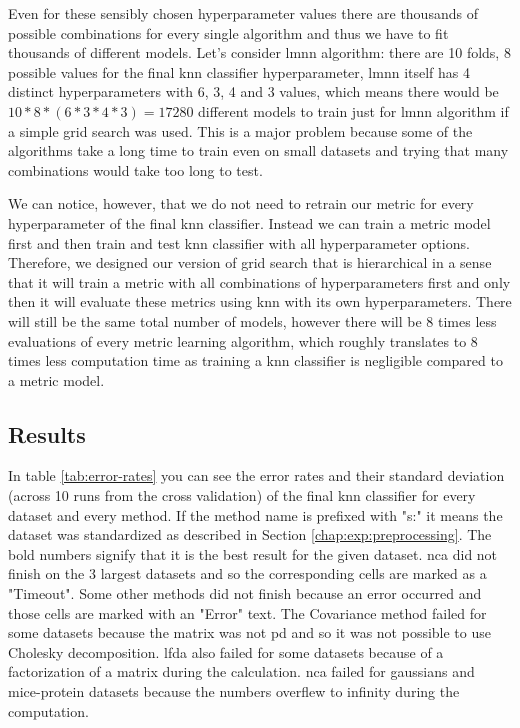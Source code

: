 \documentclass[12pt,a4paper]{report}
\begin{document}


Even for these sensibly chosen hyperparameter values there are thousands of possible combinations for every single algorithm and thus we have to fit thousands of different models. Let's consider \ac{lmnn} algorithm: there are 10 folds, 8 possible values for the final \ac{knn} classifier hyperparameter, \ac{lmnn} itself has 4 distinct hyperparameters with 6, 3, 4 and 3 values, which means there would be $10*8*(6*3*4*3)=17280$ different models to train just for \ac{lmnn} algorithm if a simple grid search was used. This is a major problem because some of the algorithms take a long time to train even on small datasets and trying that many combinations would take too long to test.

We can notice, however, that we do not need to retrain our metric for every hyperparameter of the final \ac{knn} classifier. Instead we can train a metric model first and then train and test \ac{knn} classifier with all hyperparameter options. Therefore, we designed our version of grid search that is hierarchical in a sense that it will train a metric with all combinations of hyperparameters first and only then it will evaluate these metrics using \ac{knn} with its own hyperparameters. There will still be the same total number of models, however there will be 8 times less evaluations of every metric learning algorithm, which roughly translates to 8 times less computation time as training a \ac{knn} classifier is negligible compared to a metric model.

\subsection{Results}

In table \ref{tab:error-rates} you can see the error rates and their standard deviation (across 10 runs from the cross validation) of the final \ac{knn} classifier for every dataset and every method. If the method name is prefixed with "s:" it means the dataset was standardized as described in Section \ref{chap:exp:preprocessing}. The bold numbers signify that it is the best result for the given dataset. \ac{nca} did not finish on the 3 largest datasets and so the corresponding cells are marked as a "Timeout". Some other methods did not finish because an error occurred and those cells are marked with an "Error" text. The Covariance method failed for some datasets because the matrix was not \ac{pd} and so it was not possible to use Cholesky decomposition. \ac{lfda} also failed for some datasets because of a factorization of a matrix during the calculation. \ac{nca} failed for gaussians and mice-protein datasets because the numbers overflew to infinity during the computation.
\end{document}
